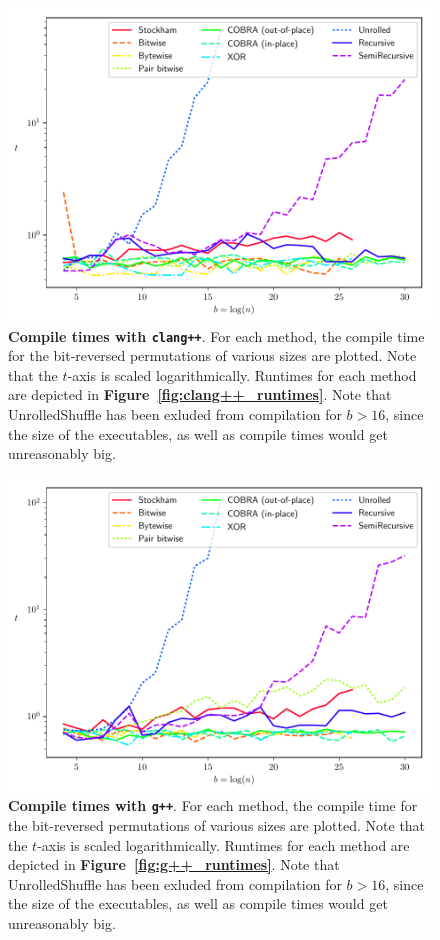 \documentclass[10pt]{article}
\begin{document}
\begin{figure}[ht!]
\centering
  \includegraphics[width=4.5in]{results/clang++_compile_times.pdf}
\caption{{\bf Compile times with {\tt clang++}}. For each method, the
  compile time for the bit-reversed permutations of various sizes are
  plotted. Note that the $t$-axis is scaled logarithmically.  Runtimes
  for each method are depicted in {\bf Figure~\ref{fig:clang++_runtimes}}.
  Note that UnrolledShuffle has been exluded from compilation for
  $b>16$, since the size of the executables, as well as compile times
  would get unreasonably big.
  \label{fig:clang++_compile_times}	
}
\end{figure}

\begin{figure}[ht!]
\centering
  \includegraphics[width=4.5in]{results/g++_compile_times.pdf}
\caption{{\bf Compile times with {\tt g++}}. For each method, the
  compile time for the bit-reversed permutations of various sizes are
  plotted. Note that the $t$-axis is scaled logarithmically.  Runtimes
  for each method are depicted in {\bf Figure~\ref{fig:g++_runtimes}}. Note
  that UnrolledShuffle has been exluded from compilation for $b>16$,
  since the size of the executables, as well as compile times would
  get unreasonably big.
  \label{fig:g++_compile_times}	
}
\end{figure}
\end{document}
